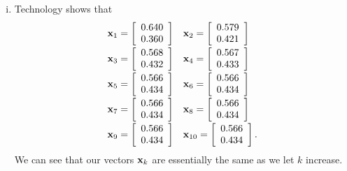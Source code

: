 \begin{example}
	\item 
	\begin{enumerate}[i.]
	\item Technology shows that
	\[
	\begin{array}{ll}
	\vx_1 = \left[ \begin{array}{c} 0.640\\0.360 \end{array} \right] &
	\vx_2 = \left[ \begin{array}{c} 0.579\\0.421 \end{array} \right] \vspace{2pt} \\
	\vx_3 = \left[ \begin{array}{c} 0.568\\0.432 \end{array} \right] &
	\vx_4 = \left[ \begin{array}{c} 0.567\\0.433 \end{array} \right]  \vspace{2pt}  \\
	\vx_5 = \left[ \begin{array}{c} 0.566\\0.434 \end{array} \right] &
	\vx_6 = \left[ \begin{array}{c} 0.566\\0.434 \end{array} \right]  \vspace{2pt}  \\
	\vx_7 = \left[ \begin{array}{c} 0.566\\0.434 \end{array} \right] &
	\vx_8 = \left[ \begin{array}{c} 0.566\\0.434 \end{array} \right]  \vspace{2pt}  \\
	\vx_9 = \left[ \begin{array}{c} 0.566\\0.434 \end{array} \right] &
	\vx_{10} = \left[ \begin{array}{c} 0.566\\0.434 \end{array} \right].
	\end{array} \]
	We can see that our vectors $\mathbf{x}_k$ are essentially the same as we let $k$ increase. 
	

\end{enumerate}
\end{example}
